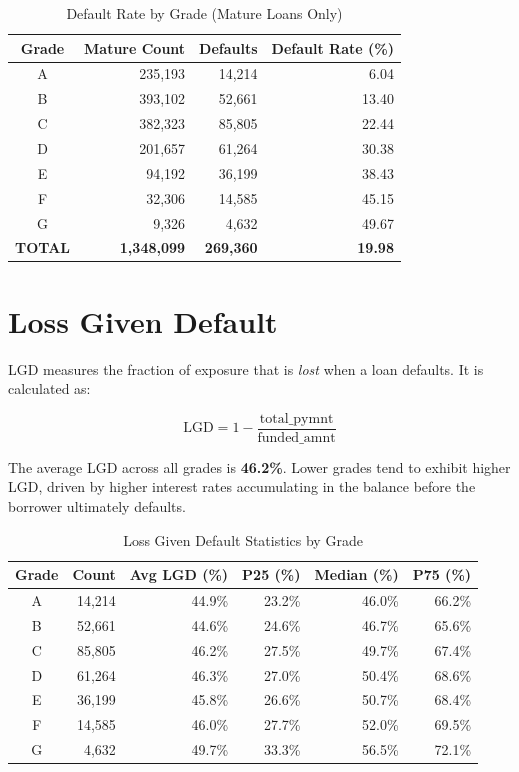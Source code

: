 \documentclass[11pt, a4paper]{article}
\begin{document}
\begin{table}[H]
\centering
\caption{Default Rate by Grade (Mature Loans Only)}
\begin{tabular}{c r r r}
\toprule
\textbf{Grade} & \textbf{Mature Count} & \textbf{Defaults} & \textbf{Default Rate (\%)} \\
\midrule
A & 235,193 & 14,214 & 6.04 \\
B & 393,102 & 52,661 & 13.40 \\
C & 382,323 & 85,805 & 22.44 \\
D & 201,657 & 61,264 & 30.38 \\
E & 94,192 & 36,199 & 38.43 \\
F & 32,306 & 14,585 & 45.15 \\
G & 9,326 & 4,632 & 49.67 \\
\textbf{TOTAL} & \textbf{1,348,099} & \textbf{269,360} & \textbf{19.98} \\
\bottomrule
\end{tabular}
\label{tab:defaults}
\end{table}

\section{Loss Given Default}
\label{sec:lgd}

LGD measures the fraction of exposure that is \emph{lost} when a loan defaults.  It is
calculated as:

\begin{equation}
    \text{LGD} = 1 - \frac{\text{total\_pymnt}}{\text{funded\_amnt}}
\end{equation}

The average LGD across all grades is \textbf{46.2\%}.  Lower grades
tend to exhibit higher LGD, driven by higher interest rates accumulating in the balance
before the borrower ultimately defaults.

\begin{table}[H]
\centering
\caption{Loss Given Default Statistics by Grade}
\begin{tabular}{c r r r r r}
\toprule
\textbf{Grade} & \textbf{Count} & \textbf{Avg LGD (\%)} & \textbf{P25 (\%)} & \textbf{Median (\%)} & \textbf{P75 (\%)} \\
\midrule
A & 14,214 & 44.9\% & 23.2\% & 46.0\% & 66.2\% \\
B & 52,661 & 44.6\% & 24.6\% & 46.7\% & 65.6\% \\
C & 85,805 & 46.2\% & 27.5\% & 49.7\% & 67.4\% \\
D & 61,264 & 46.3\% & 27.0\% & 50.4\% & 68.6\% \\
E & 36,199 & 45.8\% & 26.6\% & 50.7\% & 68.4\% \\
F & 14,585 & 46.0\% & 27.7\% & 52.0\% & 69.5\% \\
G & 4,632 & 49.7\% & 33.3\% & 56.5\% & 72.1\% \\
\bottomrule
\end{tabular}
\label{tab:lgd}
\end{table}
\end{document}
